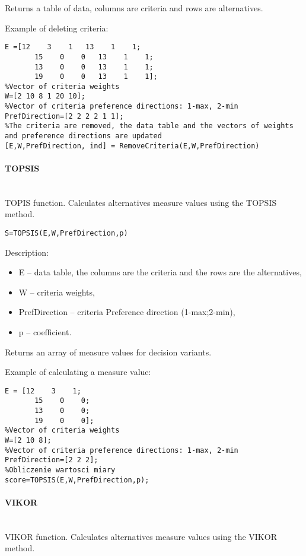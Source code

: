 Returns a table of data, columns are criteria and rows are alternatives.

Example of deleting criteria:
\begin{lstlisting}[style=Matlab-editor]
%Data table
E =[12    3    1   13    1    1;
       15    0    0   13    1    1;
       13    0    0   13    1    1;
       19    0    0   13    1    1];
%Vector of criteria weights
W=[2 10 8 1 20 10];
%Vector of criteria preference directions: 1-max, 2-min
PrefDirection=[2 2 2 2 1 1];
%The criteria are removed, the data table and the vectors of weights and preference directions are updated
[E,W,PrefDirection, ind] = RemoveCriteria(E,W,PrefDirection)
\end{lstlisting}

\paragraph{TOPSIS} \hspace{0pt} \\
TOPIS function. Calculates alternatives measure values using the TOPSIS method.

\begin{lstlisting}[style=Matlab-editor]
S=TOPSIS(E,W,PrefDirection,p)
\end{lstlisting}

Description:
\begin{itemize}
\item  E -- data table, the columns are the criteria and the rows are the alternatives,
\item  W -- criteria weights,
\item  PrefDirection -- criteria Preference direction (1-max;2-min),
\item  p -- coefficient.
\end{itemize}

Returns an array of measure values for decision variants.

Example of calculating a measure value:
\begin{lstlisting}[style=Matlab-editor]
%Data table
E = [12    3    1;
       15    0    0;
       13    0    0;
       19    0    0];
%Vector of criteria weights
W=[2 10 8];
%Vector of criteria preference directions: 1-max, 2-min
PrefDirection=[2 2 2];
%Obliczenie wartosci miary
score=TOPSIS(E,W,PrefDirection,p);
\end{lstlisting}

\paragraph{VIKOR} \hspace{0pt} \\
VIKOR function. Calculates alternatives measure values using the VIKOR method.

